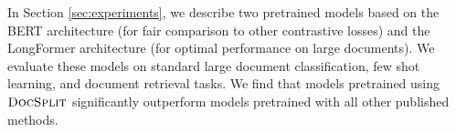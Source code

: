 \documentclass[11pt]{article}
\newcommand{\our}{\mbox{\textsc{DocSplit}}}
\begin{document}
In Section \ref{sec:experiments}, we describe two pretrained models based on the BERT architecture (for fair comparison to other contrastive losses) and the LongFormer architecture (for optimal performance on large documents).
We evaluate these models on standard large document classification, few shot learning, and document retrieval tasks.
We find that models pretrained using $\our$ significantly outperform models pretrained with all other published methods.



\end{document}
